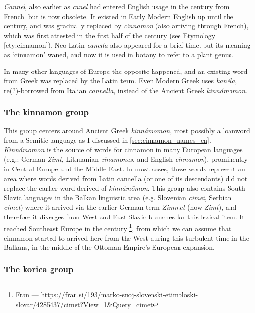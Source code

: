 \textit{\obs Cannel}, also earlier as \textit{canel} had entered English usage in the  century from French, but is now obsolete. It existed in Early Modern English up until the  century, and was gradually replaced by \textit{cinnamon} (also arriving through French), which was first attested in the first half of the  century (see Etymology \ref{ety:cinnamon}). Neo Latin \textit{canella} also appeared for a brief time, but its meaning as `cinnamon' waned, and now it is used in botany to refer to a plant genus.

In many other languages of Europe the opposite happened, and an existing word from Greek was replaced by the Latin term. Even Modern Greek uses \textit{kanéla}, re(?)-borrowed from Italian \textit{cannella}, instead of the Ancient Greek \textit{kinnámōmon}. 

\subsubsection{The kinnamon group}

This group centers around Ancient Greek \textit{kinnámōmon}, most possibly a loanword from a Semitic language as I discussed in \cref{sec:cinnamon_names_en}. \textit{Kinnámōmon} is the source of words for cinnamon in many European languages (e.g.: German \textit{Zimt}, Lithuanian \textit{cinamonas}, and English \textit{cinnamon}), prominently in Central Europe and the Middle East. In most cases, these words represent an area where words derived from Latin cannella (or one of its descendants) did not replace the earlier word derived of \textit{kinnámōmon}. This group also contains South Slavic languages in the Balkan linguistic area (e.g. Slovenian \textit{cimet}, Serbian  \textit{cimet}) where it arrived via the earlier German term \textit{Zimmet} (now \textit{Zimt}), and therefore it diverges from West and East Slavic branches for this lexical item. It reached Southeast Europe in the  century \autocite[s.v. cimet]{snoj_slovenski_1997}\footnote{Fran --- \url{https://fran.si/193/marko-snoj-slovenski-etimoloski-slovar/4285437/cimet?View=1\&Query=cimet}}, from which we can assume that cinnamon started to arrived here from the West during this turbulent time in the Balkans, in the middle of the Ottoman Empire's European expansion.

\subsubsection{The korica group}

